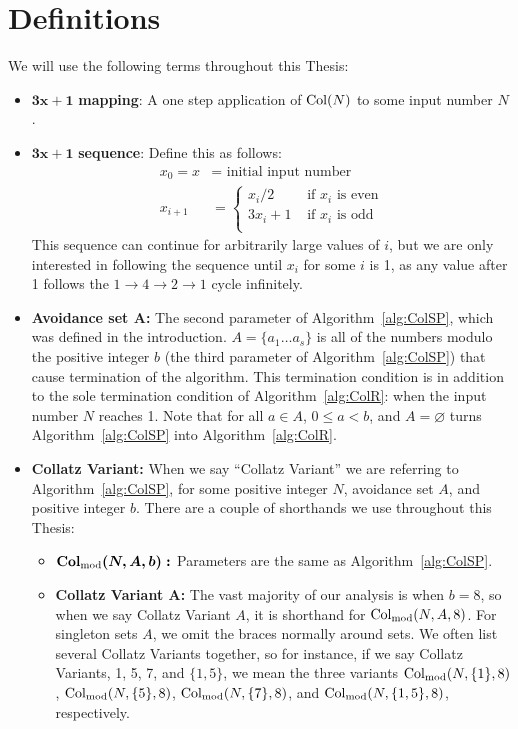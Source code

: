 \chapter{Definitions} \label{sec:defns}
We will use the following terms throughout this Thesis:
\begin{itemize}
    \item $\boldsymbol{3x+1}$\textbf{ mapping}: A one step application of $\mathrm{Col}(N)$ to some input number $N$.
    \item $\boldsymbol{3x+1}$\textbf{ sequence}: Define this as follows: 
    \begin{align*}
        x_0 = x &= \text{ initial input number} \\
        x_{i+1} &= \begin{cases} 
        x_{i}/2 &\text{ if $x_i$ is even} \\
        3 x_{i} + 1 &\text{ if $x_i$ is odd} \\
        \end{cases}
    \end{align*}
    This sequence can continue for arbitrarily large values of $i$, but we are only interested in following the sequence until $x_i$ for some $i$ is 1, as any value after 1 follows the $1 \rightarrow 4 \rightarrow 2 \rightarrow 1$ cycle infinitely.
    \item \textbf{Avoidance set $\boldsymbol A$:} The second parameter of Algorithm~\ref{alg:ColSP}, which was defined in the introduction. $A = \{a_1 \ldots a_s\}$ is all of the numbers modulo the positive integer $b$ (the third parameter of Algorithm~\ref{alg:ColSP}) that cause termination of the algorithm. This termination condition is in addition to the sole termination condition of Algorithm~\ref{alg:ColR}: when the input number $N$ reaches 1. Note that for all $a \in A$, $0 \le a < b$, and $A = \varnothing$ turns Algorithm~\ref{alg:ColSP} into Algorithm~\ref{alg:ColR}.
    \item \textbf{Collatz Variant:} When we say ``Collatz Variant'' we are referring to Algorithm~\ref{alg:ColSP}, for some positive integer $N$, avoidance set $A$, and positive integer $b$. There are a couple of shorthands we use throughout this Thesis:
      \begin{itemize}
      \item $\boldsymbol{\mathrm{Col}_{\text{mod}}(N,A,b):}$ Parameters are the same as Algorithm~\ref{alg:ColSP}.
      \item \textbf{Collatz Variant A:} The vast majority of our analysis is when $b = 8$, so when we say Collatz Variant $A$, it is shorthand for $\mathrm{Col}_{\text{mod}}(N,A,8)$. For singleton sets $A$, we omit the braces normally around sets. We often list several Collatz Variants together, so for instance, if we say Collatz Variants, 1, 5, 7, and $\{1,5\}$, we mean the three variants $\mathrm{Col}_{\text{mod}}(N,\{1\},8)$, $\mathrm{Col}_{\text{mod}}(N,\{5\},8)$, $\mathrm{Col}_{\text{mod}}(N,\{7\},8)$, and $\mathrm{Col}_{\text{mod}}(N,\{1,5\},8)$, respectively.

\end{itemize}
\end{itemize}
